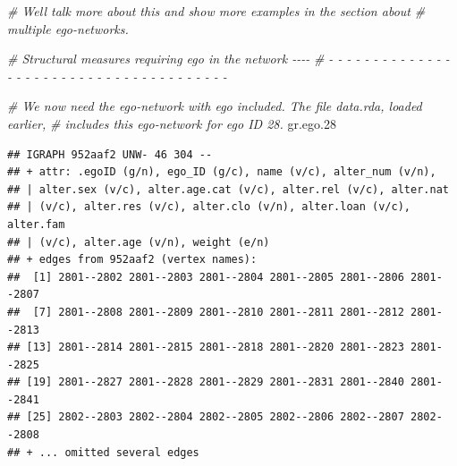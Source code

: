 \documentclass[
]{book}
\newenvironment{Shaded}{\begin{snugshade}}{\end{snugshade}}
\newcommand{\AttributeTok}[1]{\textcolor[rgb]{0.77,0.63,0.00}{#1}}
\newcommand{\CommentTok}[1]{\textcolor[rgb]{0.56,0.35,0.01}{\textit{#1}}}
\newcommand{\ConstantTok}[1]{\textcolor[rgb]{0.00,0.00,0.00}{#1}}
\newcommand{\FloatTok}[1]{\textcolor[rgb]{0.00,0.00,0.81}{#1}}
\newcommand{\FunctionTok}[1]{\textcolor[rgb]{0.00,0.00,0.00}{#1}}
\newcommand{\NormalTok}[1]{#1}
\newcommand{\OtherTok}[1]{\textcolor[rgb]{0.56,0.35,0.01}{#1}}
\newcommand{\StringTok}[1]{\textcolor[rgb]{0.31,0.60,0.02}{#1}}
\begin{document}
\begin{Shaded}
\begin{Highlighting}[]
\CommentTok{\# We\textquotesingle{}ll talk more about this and show more examples in the section about }
\CommentTok{\# multiple ego{-}networks.}

\CommentTok{\# Structural measures requiring ego in the network                          {-}{-}{-}{-}}
\CommentTok{\# {-} {-} {-} {-} {-} {-} {-} {-} {-} {-} {-} {-} {-} {-} {-} {-} {-} {-} {-} {-} {-} {-} {-} {-} {-} {-} {-} {-} {-} {-} {-} {-} {-} {-} {-} {-} {-} {-} {-} }

\CommentTok{\# We now need the ego{-}network with ego included. The file data.rda, loaded earlier,}
\CommentTok{\# includes this ego{-}network for ego ID 28. }
\NormalTok{gr.ego}\FloatTok{.28}
\end{Highlighting}
\end{Shaded}

\begin{verbatim}
## IGRAPH 952aaf2 UNW- 46 304 -- 
## + attr: .egoID (g/n), ego_ID (g/c), name (v/c), alter_num (v/n),
## | alter.sex (v/c), alter.age.cat (v/c), alter.rel (v/c), alter.nat
## | (v/c), alter.res (v/c), alter.clo (v/n), alter.loan (v/c), alter.fam
## | (v/c), alter.age (v/n), weight (e/n)
## + edges from 952aaf2 (vertex names):
##  [1] 2801--2802 2801--2803 2801--2804 2801--2805 2801--2806 2801--2807
##  [7] 2801--2808 2801--2809 2801--2810 2801--2811 2801--2812 2801--2813
## [13] 2801--2814 2801--2815 2801--2818 2801--2820 2801--2823 2801--2825
## [19] 2801--2827 2801--2828 2801--2829 2801--2831 2801--2840 2801--2841
## [25] 2802--2803 2802--2804 2802--2805 2802--2806 2802--2807 2802--2808
## + ... omitted several edges
\end{verbatim}

\begin{Shaded}
\end{Shaded}
\end{document}
